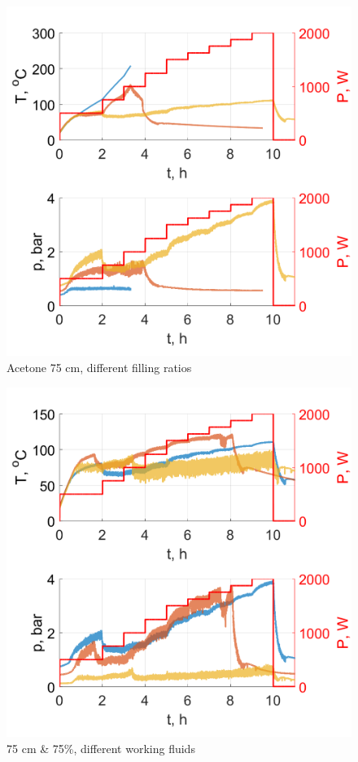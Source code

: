 \documentclass[article]{elsarticle}
\begin{document}
\begin{figure}[h]
\centering
\includegraphics[width=1\textwidth]{figures/Aceton75cm.png}
\caption{Acetone 75 cm, different filling ratios}
\label{jdm1}
\end{figure}

\begin{figure}[h]
\centering
\includegraphics[width=1\textwidth]{figures/AcetonEtanolWoda75cm_1.png}
\caption{75 cm \& 75\%, different working fluids}
\label{jdm1}
\end{figure}
\end{document}
